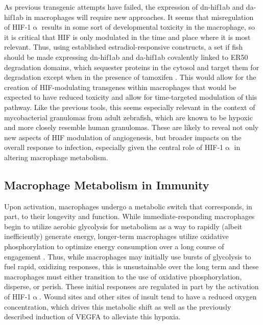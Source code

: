 As previous transgenic attempts have failed, the expression of dn-hif1ab and da-hif1ab in macrophages will require new approaches. It seems that misregulation of HIF-1$\upalpha$ results in some sort of developmental toxicity in the macrophage, so it is critical that HIF is only modulated in the time and place where it is most relevant. Thus, using established estradiol-responsive constructs, a set if fish should be made expressing dn-hif1ab and da-hif1ab covalently linked to ER50 degradation domains, which sequester proteins in the cytosol and target them for degradation except when in the presence of tamoxifen \citep{Miyazaki2012}. This would allow for the creation of HIF-modulating transgenes within macrophages that would be expected to have reduced toxicity and allow for time-targeted modulation of this pathway. Like the previous tools, this seems especially relevant in the context of mycobacterial granulomas from adult zebrafish, which are known to be hypoxic and more closely resemble human granulomas. These are likely to reveal not only new aspects of HIF modulation of angiogenesis, but broader impacts on the overall response to infection, especially given the central role of HIF-1$\upalpha$ in altering macrophage metabolism.

\subsection{Macrophage Metabolism in Immunity}

\citep{Biswas2012, Chawla2001, Corcoran2016, Covarrubias2015, Escoll2019, GalvanPena2014, He2021, Hong2004, Howard2020, Kelly2015, Langston2017, Mehla2019, Odegaard2011, OsadaOka2019, Palmieri2020, Phan2017, Qualls2016, Rabold2017, Russell2019, Somashekar2011, Stunault2018, Taylor2022, Viola2019, Wenes2016, Wilson2019, Yan2020, Yu2020}

Upon activation, macrophages undergo a metabolic switch that corresponds, in part, to their longevity and function. While immediate-responding macrophages begin to utilize aerobic glycolysis for metabolism as a way to rapidly (albeit inefficiently) generate energy, longer-term macrophages utilize oxidative phosphorylation to optimize energy consumption over a long course of engagement \citep{Kiran2016}. Thus, while macrophages may initially use bursts of glycolysis to fuel rapid, oxidizing responses, this is unsustainable over the long term and these macrophages must either transition to the use of oxidative phosphorylation, disperse, or perish. These initial responses are regulated in part by the activation of HIF-1$\upalpha$. Wound sites and other sites of insult tend to have a reduced oxygen concentration, which drives this metabolic shift as well as the previously described induction of VEGFA to alleviate this hypoxia. 

